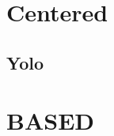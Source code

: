 \documentclass{article}
\begin{document}
\section{Centered}

\subsection{Yolo}

\section{BASED}
\end{document}
